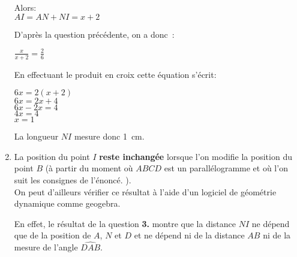 \begin{corrige}
\begin{enumerate}
          Alors:
          \\
          $ AI=AN+NI=x+2 $
          \par
          D'après la question précédente, on a donc~:
          \par
          $ \frac{ x }{ x+2 } = \frac{ 2 }{ 6 }    $
          \par
          En effectuant le produit en croix cette équation s'écrit:
          \par
          $ 6x=2  \left( x+2 \right)   $
          \\
          $ 6x=2x+4 $
          \\
          $ 6x-2x=4 $
          \\
          $4x=4  $
          \\
          $ x=1 $
          \par
          La longueur $ NI $ mesure donc 1~cm.
          \item
          La position du point $ I$  \textbf{ reste inchangée} lorsque l'on modifie la position du point $ B $ (à partir du moment où $ ABCD $ est un parallélogramme et où l'on suit les consignes de l'énoncé. ).
          \\
          On peut d'ailleurs vérifier ce résultat à l'aide d'un logiciel de géométrie dynamique comme geogebra.
          \par
          En effet, le résultat de la question  \textbf{3.} montre que la distance $ NI $ ne dépend que de la position de $A$, $N$ et $D$ et ne dépend ni de la distance $ AB $ ni de la mesure de l'angle $  \widehat{ DAB } .  $
     \end{enumerate}
\end{corrige}
